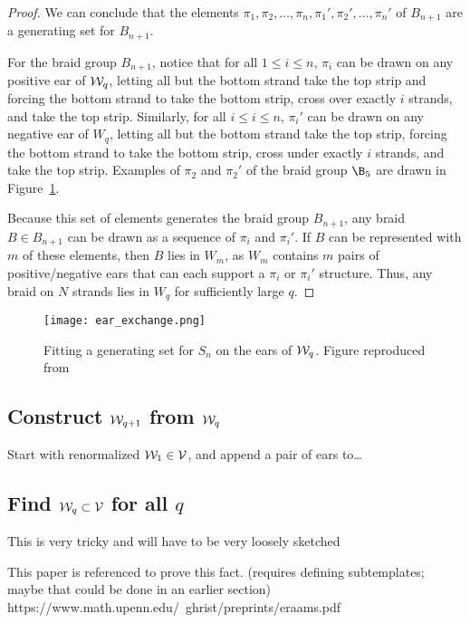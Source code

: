 \documentclass[paper.tex]{subfiles}
\begin{document}
\begin{proof}
    We can conclude that the elements $\pi_1, \pi_2, \dots, \pi_n, \pi_1', \pi_2', \dots, \pi_n'$ of $B_{n+1}$ are a generating set for $B_{n+1}$. 


    For the braid group $B_{n+1}$, notice that for all $1 \leq i \leq n$, $\pi_i$ can be drawn on any positive ear of $\mathcal{W}_q$, letting all but the bottom strand take the top strip and forcing the bottom strand to take the bottom strip, cross over exactly $i$ strands, and take the top strip. Similarly, for all $i \leq i \leq n$, $\pi_i'$ can be drawn on any negative ear of $W_q$, letting all but the bottom strand take the top strip, forcing the bottom strand to take the bottom strip, cross under exactly $i$ strands, and take the top strip. Examples of $\pi_2$ and $\pi_2'$ of the braid group $\B_5$ are drawn in Figure~\ref{fig:earexchange}. 

    Because this set of elements generates the braid group $B_{n+1}$, any braid $B \in B_{n+1}$ can be drawn as a sequence of $\pi_i$ and $\pi_i'$. If $B$ can be represented with $m$ of these elements, then $B$ lies in $W_m$, as $W_m$ contains $m$ pairs of positive/negative ears that can each support a $\pi_i$ or $\pi_i'$ structure. Thus, any braid on $N$ strands lies in $W_q$ for sufficiently large $q$. 

\end{proof}



\begin{figure}[h]
  \centering
  \texttt{[image: ear\_exchange.png]}
  \caption{Fitting a generating set for $S_n$ on the ears of $\mathcal{W}_q$. Figure reproduced from~\cite{Ghrist1996}}\label{fig:earexchange}
\end{figure}




\subsection{Construct $\mathcal{W}_{q+1}$ from $\mathcal{W}_q$}

Start with renormalized $\mathcal{W}_1 \in \mathcal{V}$, and append a pair of ears to\dots


\subsection{Find $\mathcal{W}_q \subset \mathcal{V}$ for all $q$}

This is very tricky and will have to be very loosely sketched

This paper is referenced to prove this fact. (requires defining subtemplates; maybe that could be done in an earlier section)
https://www.math.upenn.edu/~ghrist/preprints/eraams.pdf
\end{document}

